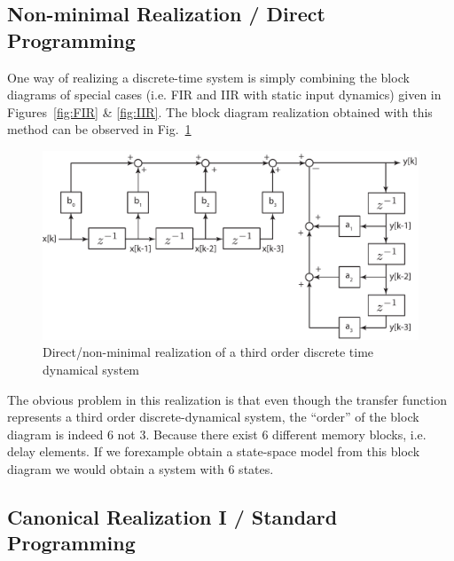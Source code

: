 \documentclass[twoside]{article}
\begin{document}
\subsection*{Non-minimal Realization / Direct Programming}

One way of realizing a discrete-time system is simply combining
the block diagrams of special cases (i.e. FIR and IIR with static input
dynamics) given in Figures~\ref{fig:FIR} \& \ref{fig:IIR}. The block
diagram realization obtained with this method can be observed in
Fig.~\ref{fig:direct}
%
\begin{figure}[h]
    \centering
      \includegraphics[width=1\textwidth]{direct}
    \caption{Direct/non-minimal realization of a third order discrete
      time dynamical system}
        \label{fig:direct}
\end{figure}

The obvious problem in this realization is that even though the transfer function
represents a third order discrete-dynamical system, the ``order'' 
of the block diagram is indeed 6 not 3. Because there exist 6
different memory blocks, i.e. delay elements. If we forexample
obtain a state-space model from this block diagram we would obtain 
a system with 6 states. 

\newpage

\subsection*{Canonical Realization I / Standard Programming}
\end{document}
